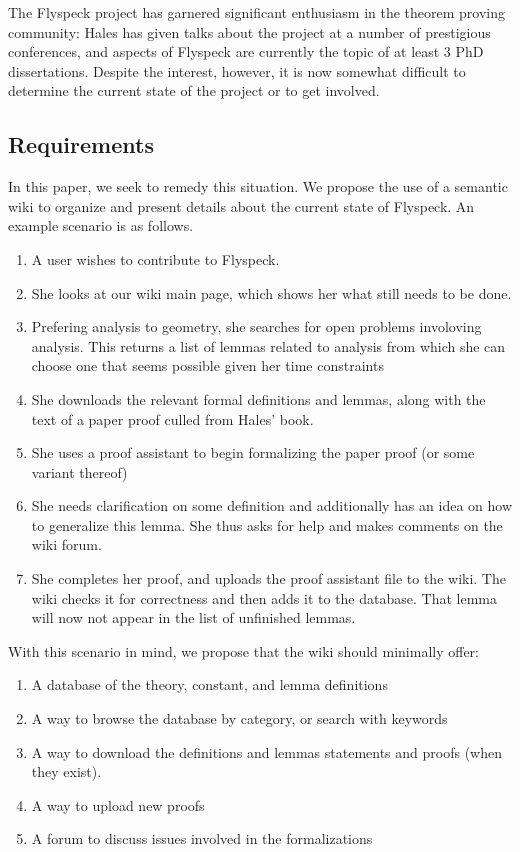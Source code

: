 The Flyspeck project has garnered significant enthusiasm in the theorem proving
community: Hales has given talks about the project at a number of
prestigious conferences, and aspects of Flyspeck are currently the topic of at least
3 PhD dissertations.  Despite the interest, however, it is now somewhat difficult to 
determine the current state of the project or to get involved.  



\subsection{Requirements}
In this paper, we seek to remedy this situation.  We propose the use of a 
semantic wiki to organize and present details about the current state of Flyspeck.
An example scenario is as follows.  

\begin{enumerate}  
\item A user wishes to contribute to Flyspeck. 
\item She looks at our wiki main page, which shows her what still needs to be done. 
\item Prefering analysis to geometry, she searches for open problems involoving analysis.  
  This returns a list of lemmas related to analysis from which she can choose one that 
  seems possible given her time constraints 
\item She downloads the relevant formal definitions and lemmas, along with the text 
  of a paper proof culled from Hales' book. 
\item She uses a proof assistant to begin formalizing the paper proof (or some variant thereof) 
\item She needs clarification on some definition and additionally has an idea on how to generalize this 
  lemma.  She thus asks for help and makes comments on the wiki forum.   
\item She completes her proof, and uploads the proof assistant file to the wiki. 
  The wiki checks it for correctness and then adds it to the database.  That lemma will 
  now not appear in the list of unfinished lemmas. 
\end{enumerate}  

With this scenario in mind, we propose that the wiki should minimally offer: 

\begin{enumerate}  
\item A database of the theory, constant, and lemma definitions 
\item A way to browse the database by category, or search with keywords 
\item A way to download the definitions and lemmas statements and proofs (when they exist).   
\item A way to upload new proofs 
\item A forum to discuss issues involved in the formalizations 
\end{enumerate}      

